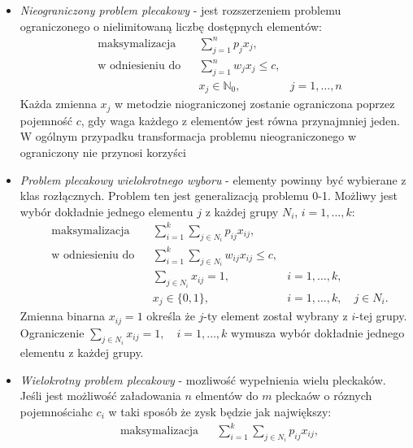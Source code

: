 \begin{itemize}
  \item \textit{Nieograniczony problem plecakowy} - jest rozszerzeniem problemu ograniczonego o nielimitowaną liczbę dostępnych elementów:
  \begin{equation}\label{unboundedKnapsack}
    \begin{aligned}
      & \textrm{maksymalizacja} & & \sum_{j=1}^n p_jx_j, \\
      & \textrm{w odniesieniu do} & & \sum_{j=1}^n w_jx_j \le c, \\
      &&& x_j \in \mathbb{N}_0,& j = 1,\dots,n
    \end{aligned}
  \end{equation}
  Każda zmienna $x_j$ w metodzie niograniczonej zostanie ograniczona poprzez pojemność $c$, gdy waga każdego z elementów jest równa przynajmniej jeden. W ogólnym przypadku transformacja problemu nieograniczonego w ograniczony nie przynosi korzyści
  \item \textit{Problem plecakowy wielokrotnego wyboru} - elementy powinny być wybierane z klas rozłącznych. Problem ten jest generalizacją problemu 0-1. Możliwy jest wybór dokładnie jednego elementu $j$ z każdej grupy $N_i$, $i=1,\dots,k$:
  \begin{equation}\label{multichoiceKnapsack}
    \begin{aligned}
      & \textrm{maksymalizacja} & & \sum_{i=1}^k \sum_{j \in N_i} p_{ij}x_{ij}, \\
      & \textrm{w odniesieniu do} & & \sum_{i=1}^k \sum_{j \in N_i} w_{ij}x_{ij} \le c, \\
      &&& \sum_{j \in N_i} x_{ij} = 1, & i =1,\dots,k, \\
      &&& x_j \in\{0,1\},& i = 1,\dots,k, \quad j \in N_i.
    \end{aligned}
  \end{equation}
  Zmienna binarna $x_{ij} = 1$ określa że $j$-ty element został wybrany z $i$-tej grupy. Ograniczenie $\sum_{j \in N_i} x_{ij} = 1, \quad i =1,\dots,k$ wymusza wybór dokładnie jednego elementu z każdej grupy.
  \item \textit{Wielokrotny problem plecakowy} - mozliwość wypełnienia wielu pleckaków. Jeśli jest możliwość załadowania $n$ elmentów do $m$ pleckaów o róznych pojemnościahc $c_i$ w taki sposób że zysk będzie jak największy:
  \begin{equation}\label{multiKnapsack}
    \begin{aligned}
      & \textrm{maksymalizacja} & & \sum_{i=1}^k \sum_{j \in N_i} p_{ij}x_{ij}, \\

\end{aligned}
\end{equation}
\end{itemize}
